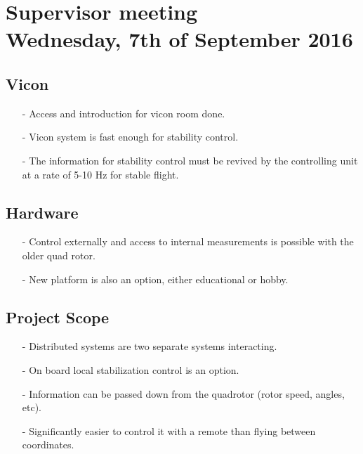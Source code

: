 
\renewcommand{\vec}[1]{\boldsymbol{\mathbf{#1}}}

\renewcommand\chaptername{KAPITEL}
\renewcommand\contentsname{Indhold}
\renewcommand\figurename{Figur}
\renewcommand\tablename{Tabel}

\section*{Supervisor meeting\\ \small Wednesday, 7th of September 2016}

\subsection{Vicon}
\begin{itemize}
  \item[-] Access and introduction for vicon room done.
  \item[-] Vicon system is fast enough for stability control.
  \item[-] The information for stability control must be revived by the controlling unit at a rate of 5-10 Hz for stable flight.
\end{itemize}

\subsection{Hardware}
\begin{itemize}
  \item[-] Control externally and access to internal measurements is possible with the older quad rotor.
  \item[-] New platform is also an option, either educational or hobby.
\end{itemize}

\subsection{Project Scope}
\begin{itemize}
  \item[-] Distributed systems are two separate systems interacting.
  \item[-] On board local stabilization control is an option.
  \item[-] Information can be passed down from the quadrotor (rotor speed, angles, etc).
  \item[-] Significantly easier to control it with a remote than flying between coordinates.
\end{itemize}


